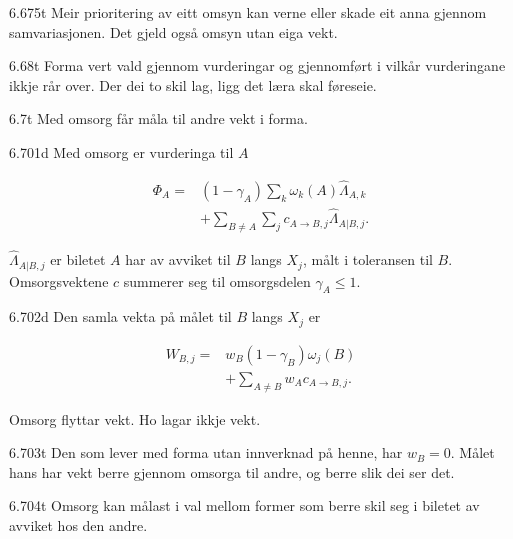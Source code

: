 \begin{formproposition}{6.675}{t}
Meir prioritering av eitt omsyn kan verne eller skade eit anna gjennom samvariasjonen. Det gjeld også omsyn utan eiga vekt.
\end{formproposition}

\begin{formproposition}{6.68}{t}
Forma vert vald gjennom vurderingar og gjennomført i vilkår vurderingane ikkje rår over. Der dei to skil lag, ligg det læra skal føreseie.
\end{formproposition}

\begin{formproposition}{6.7}{t}
Med omsorg får måla til andre vekt i forma.
\end{formproposition}

\begin{formproposition}{6.701}{d}
Med omsorg er vurderinga til \(A\)

\[
\begin{aligned}
\Phi_A={}&(1-\gamma_A)\sum_k\omega_k(A)\hat\Lambda_{A,k}\\
&+\sum_{B\ne A}\sum_j c_{A\to B,j}\hat\Lambda_{A|B,j}.
\end{aligned}
\]

\(\hat\Lambda_{A|B,j}\) er biletet \(A\) har av avviket til \(B\) langs \(X_j\), målt i toleransen til \(B\). Omsorgsvektene \(c\) summerer seg til omsorgsdelen \(\gamma_A\leq1\).
\end{formproposition}

\begin{formproposition}{6.702}{d}
Den samla vekta på målet til \(B\) langs \(X_j\) er

\[
\begin{aligned}
W_{B,j}={}&w_B(1-\gamma_B)\omega_j(B)\\
&+\sum_{A\ne B}w_Ac_{A\to B,j}.
\end{aligned}
\]

Omsorg flyttar vekt. Ho lagar ikkje vekt.
\end{formproposition}

\begin{formproposition}{6.703}{t}
Den som lever med forma utan innverknad på henne, har \(w_B=0\). Målet hans har vekt berre gjennom omsorga til andre, og berre slik dei ser det.
\end{formproposition}

\begin{formproposition}{6.704}{t}
Omsorg kan målast i val mellom former som berre skil seg i biletet av avviket hos den andre.
\end{formproposition}


